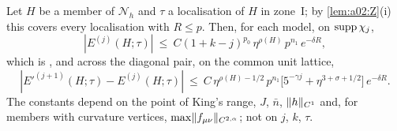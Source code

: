 
\begin{proposition}\label{prop:k02:KhI}
Let $H$ be a member of $\mathcal N_h$ and $\tau$ a localisation of $H$ in zone~I; by \cref{lem:a02:Z}(i) this covers every localisation with $R\le p$. Then, for each model, on $\operatorname{supp}\chi_j$,
\begin{equation}\label{eq:k02:I1}
|E^{(j)}(H;\tau)|\ \le\ C(1+k-j)^{p_0}\,\eta^{\rho(H)}\,p^{n_1}\,e^{-\delta R},
\end{equation}
which is \cite[(3.39)]{K1}, and across the diagonal pair, on the common unit lattice,
\begin{equation}\label{eq:k02:I2}
|E'^{(j+1)}(H;\tau)-E^{(j)}(H;\tau)|\ \le\ C\,\eta^{\rho(H)-1/2}\,p^{n_1}\big[5^{-\gamma j}+\eta^{3+\sigma+1/2}\big]\,e^{-\delta R}.
\end{equation}
The constants depend on the point of King's range, $J$, $\bar n$, $\lVert h\rVert_{C^1}$ and, for members with curvature vertices, $\max\lVert f_{\mu\nu}\rVert_{C^{2,\alpha}}$; not on $j$, $k$, $\tau$.
\end{proposition}
